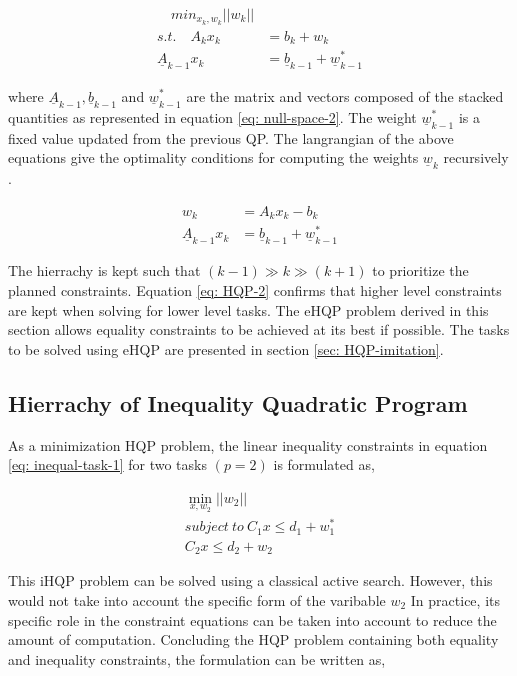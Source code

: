 \begin{align}
    \label{eq: HQP}
    \quad min_{x_k, w_k}||w_k|| \\
    \mathit{s.t.} \quad    A_kx_k &= b_k + w_k \\
    \underline{A}_{k - 1}x_k &= \underline{b}_{k - 1} + \underline{w}_{k - 1}^*
\end{align}

where $\underline{A}_{k - 1}, \underline{b}_{k - 1}$ and $\underline{w}_{k - 1}^*$ are the matrix and vectors composed of the stacked quantities 
as represented in equation \ref{eq: null-space-2}. The weight $\underline{w}_{k - 1}^*$ is a fixed value updated from the previous QP.
The langrangian of the above equations give the optimality conditions for computing the weights $\underline{w}_k$ 
recursively \cite{escande2014hierarchical}.

\begin{align}
    \label{eq: HQP-2}
    w_k &= A_kx_k - b_k \\
    \underline{A}_{k - 1}x_k &= \underline{b}_{k - 1} + \underline{w}_{k - 1}^ *
\end{align}

The hierrachy is kept such that $(k -1) \gg k \gg (k + 1)$ to prioritize the planned constraints. Equation \ref{eq: HQP-2} confirms that 
higher level constraints are kept when solving for lower level tasks. The eHQP problem derived in this section allows equality constraints to
 be achieved at its best if possible.  The tasks to be solved using eHQP are presented in section \ref{sec: HQP-imitation}.

\subsection{Hierrachy of Inequality Quadratic Program}

As a minimization HQP problem, the linear inequality constraints in equation \ref{eq: inequal-task-1} for two tasks $(p = 2)$ is formulated as,

\begin{eqnarray}
    \label{eq: inequal-task-2}
    \min_{x, w_2} ||w_2|| \\
    \mathit{subject \ to} \ C_{1}x \le d_1 + w_1^* \\
    C_2x \le d_2 + w_2
\end{eqnarray}

This iHQP problem can be solved using a classical active search. However, this would not take into account the specific form of the varibable $w_2$
In practice, its specific role in the constraint equations can be taken into account to reduce the amount of computation.
Concluding the HQP problem containing both equality and inequality constraints, the formulation can be written as,


